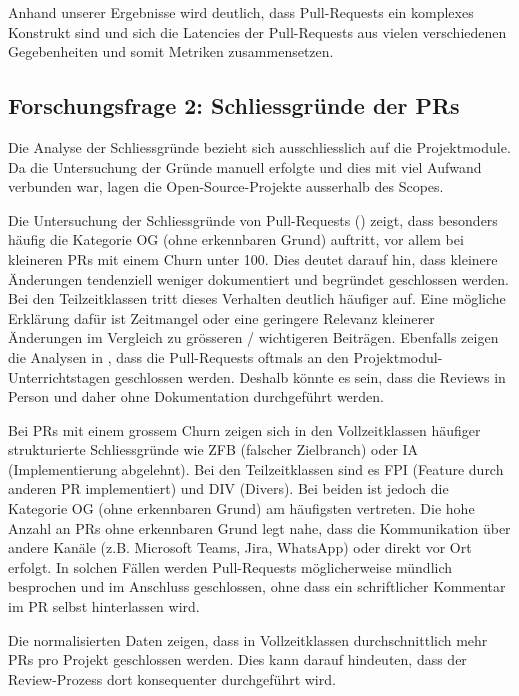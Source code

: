 Anhand unserer Ergebnisse wird deutlich, dass Pull-Requests ein komplexes Konstrukt sind und sich die Latencies der Pull-Requests aus vielen verschiedenen Gegebenheiten und somit Metriken zusammensetzen.

\subsection{Forschungsfrage 2: Schliessgründe der PRs}
Die Analyse der Schliessgründe bezieht sich ausschliesslich auf die Projektmodule. Da die Untersuchung der Gründe manuell erfolgte und dies mit viel Aufwand verbunden war, lagen die Open-Source-Projekte ausserhalb des Scopes.

Die Untersuchung der Schliessgründe von Pull-Requests () zeigt, dass besonders häufig die Kategorie OG (ohne erkennbaren Grund) auftritt, vor allem bei kleineren PRs mit einem Churn unter 100. Dies deutet darauf hin, dass kleinere Änderungen tendenziell weniger dokumentiert und begründet geschlossen werden. 
Bei den  Teilzeitklassen tritt dieses Verhalten deutlich häufiger auf. Eine mögliche Erklärung dafür ist Zeitmangel oder eine geringere Relevanz kleinerer Änderungen im Vergleich zu grösseren / wichtigeren Beiträgen. Ebenfalls zeigen die Analysen in , dass die Pull-Requests oftmals an den Projektmodul-Unterrichtstagen geschlossen werden. Deshalb könnte es sein, dass die Reviews in Person und daher ohne Dokumentation durchgeführt werden. 

Bei PRs mit einem grossem Churn zeigen sich in den Vollzeitklassen häufiger strukturierte Schliessgründe wie ZFB (falscher Zielbranch) oder IA (Implementierung
abgelehnt). Bei den Teilzeitklassen sind es FPI (Feature durch anderen
PR implementiert) und DIV (Divers). Bei beiden ist jedoch die Kategorie OG (ohne erkennbaren Grund) am häufigsten vertreten. 
Die hohe Anzahl an PRs ohne erkennbaren Grund legt nahe, dass die Kommunikation über andere Kanäle (z.B. Microsoft Teams, Jira, WhatsApp) oder direkt vor Ort erfolgt. In solchen Fällen werden Pull-Requests möglicherweise mündlich besprochen und im Anschluss geschlossen, ohne dass ein schriftlicher Kommentar im PR selbst hinterlassen wird.

Die normalisierten Daten zeigen, dass in Vollzeitklassen durchschnittlich mehr PRs pro Projekt geschlossen werden. Dies kann darauf hindeuten, dass der Review-Prozess dort konsequenter durchgeführt wird.

